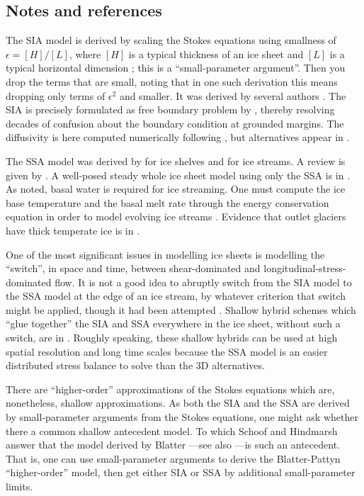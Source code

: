 \documentclass[titlepage,letterpaper,final,12pt]{scrartcl}
\newcommand{\eps}{\epsilon}
\begin{document}
\small
\subsection{Notes and references} \label{sec:nr}

The SIA model is derived by scaling the Stokes equations using smallness of $\eps = [H]/[L]$, where $[H]$ is a typical thickness of an ice sheet and $[L]$ is a typical horizontal dimension \cite{Fowler}; this is a ``small-parameter argument''.  Then you drop the terms that are small, noting that in one such derivation this means dropping only terms of $\eps^2$ and smaller.  It was derived by several authors \cite{FowlerLarson1978,MorlandJohnson,Hutter}.  The SIA is precisely formulated as free boundary problem by \cite{JouvetBueler2012}, thereby resolving decades of confusion about the boundary condition at grounded margins.  The diffusivity is here computed numerically following \cite{Mahaffy}, but alternatives appear in \cite{HindmarshPayne}.

The SSA model was derived by \cite{Morland} for ice shelves and \cite{MacAyeal} for ice streams.  A review is given by \cite{WeisGreveHutter}.  A well-posed steady whole ice sheet model using only the SSA is in \cite{SchoofStream}.  As noted, basal water is required for ice streaming.  One must compute the ice base temperature and the basal melt rate through the energy conservation equation in order to model evolving ice streams \cite{Clarke05,Raymondenergy}.  Evidence that outlet glaciers have thick temperate ice is in \cite{Luethietal2009}.

One of the most significant issues in modelling ice sheets is modelling the ``switch'', in space and time, between shear-dominated and longitudinal-stress-dominated flow.  It is not a good idea to abruptly switch from the SIA model to the SSA model at the edge of an ice stream, by whatever criterion that switch might be applied, though it had been attempted \cite{HulbeMacAyeal,Ritzetal2001}.  Shallow hybrid schemes which ``glue together'' the SIA and SSA everywhere in the ice sheet, without such a switch, are in \cite{PollardDeConto,BBssasliding,Goldberg2011}.  Roughly speaking, these shallow hybrids can be used at high spatial resolution and long time scales because the SSA model is an easier distributed stress balance to solve than the 3D alternatives.

There are ``higher-order'' approximations of the Stokes equations which are, nonetheless, shallow approximations.  As both the SIA and the SSA are derived by small-parameter arguments from the Stokes equations, one might ask whether there a common shallow antecedent model.  To which Schoof and Hindmarsh \cite{SchoofHindmarsh} answer that the model derived by Blatter \cite{Blatter}---see also \cite{Pattyn03}---is such an antecedent.  That is, one can use small-parameter arguments to derive the Blatter-Pattyn ``higher-order'' model, then get either SIA or SSA by additional small-parameter limits.
\end{document}
